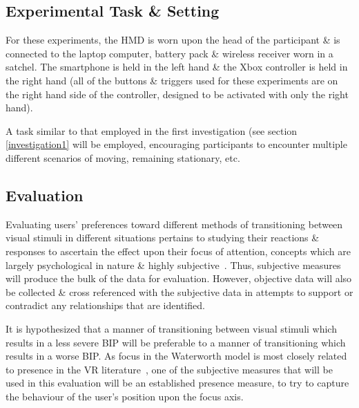 \subsection{Experimental Task \& Setting}
For these experiments, the HMD is worn upon the head of the participant \& is connected to the laptop computer, battery pack \& wireless receiver worn in a satchel. The smartphone is held in the left hand \& the Xbox controller is held in the right hand (all of the buttons \& triggers used for these experiments are on the right hand side of the controller, designed to be activated with only the right hand).

A task similar to that employed in the first investigation (see section \ref{investigation1} will be employed, encouraging participants to encounter multiple different scenarios of moving, remaining stationary, etc.

\subsection{Evaluation}


Evaluating users' preferences toward different methods of transitioning between visual stimuli in different situations pertains to studying their reactions \& responses to ascertain the effect upon their focus of attention, concepts which are largely psychological in nature \& highly subjective~\cite{Ijsselsteijn2001}. Thus, subjective measures will produce the bulk of the data for evaluation. However, objective data will also be collected \& cross referenced with the subjective data in attempts to support or contradict any relationships that are identified.

It is hypothesized that a manner of transitioning between visual stimuli which results in a less severe BIP will be preferable to a manner of transitioning which results in a worse BIP. As focus in the Waterworth model is most closely related to presence in the VR literature~\cite{Waterworth2001}, one of the subjective measures that will be used in this evaluation will be an established presence measure, to try to capture the behaviour of the user's position upon the focus axis.

